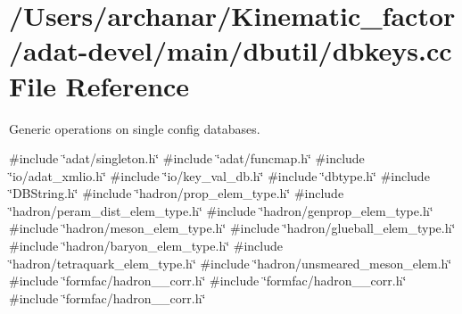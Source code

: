 \hypertarget{adat-devel_2main_2dbutil_2dbkeys_8cc}{}\section{/\+Users/archanar/\+Kinematic\+\_\+factor/adat-\/devel/main/dbutil/dbkeys.cc File Reference}
\label{adat-devel_2main_2dbutil_2dbkeys_8cc}


Generic operations on single config databases.  


{\ttfamily \#include \char`\"{}adat/singleton.\+h\char`\"{}}\newline
{\ttfamily \#include \char`\"{}adat/funcmap.\+h\char`\"{}}\newline
{\ttfamily \#include \char`\"{}io/adat\+\_\+xmlio.\+h\char`\"{}}\newline
{\ttfamily \#include \char`\"{}io/key\+\_\+val\+\_\+db.\+h\char`\"{}}\newline
{\ttfamily \#include \char`\"{}dbtype.\+h\char`\"{}}\newline
{\ttfamily \#include \char`\"{}D\+B\+String.\+h\char`\"{}}\newline
{\ttfamily \#include \char`\"{}hadron/prop\+\_\+elem\+\_\+type.\+h\char`\"{}}\newline
{\ttfamily \#include \char`\"{}hadron/peram\+\_\+dist\+\_\+elem\+\_\+type.\+h\char`\"{}}\newline
{\ttfamily \#include \char`\"{}hadron/genprop\+\_\+elem\+\_\+type.\+h\char`\"{}}\newline
{\ttfamily \#include \char`\"{}hadron/meson\+\_\+elem\+\_\+type.\+h\char`\"{}}\newline
{\ttfamily \#include \char`\"{}hadron/glueball\+\_\+elem\+\_\+type.\+h\char`\"{}}\newline
{\ttfamily \#include \char`\"{}hadron/baryon\+\_\+elem\+\_\+type.\+h\char`\"{}}\newline
{\ttfamily \#include \char`\"{}hadron/tetraquark\+\_\+elem\+\_\+type.\+h\char`\"{}}\newline
{\ttfamily \#include \char`\"{}hadron/unsmeared\+\_\+meson\+\_\+elem.\+h\char`\"{}}\newline
{\ttfamily \#include \char`\"{}formfac/hadron\+\_\+1pt\+\_\+corr.\+h\char`\"{}}\newline
{\ttfamily \#include \char`\"{}formfac/hadron\+\_\+2pt\+\_\+corr.\+h\char`\"{}}\newline
{\ttfamily \#include \char`\"{}formfac/hadron\+\_\+3pt\+\_\+corr.\+h\char`\"{}}\newline

